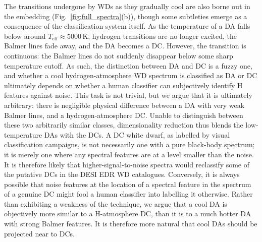 \documentclass[fleqn,usenatbib]{mnras}
\def\Teff{T_\mathrm{eff}}
\begin{document}
The transitions undergone by WDs as they gradually cool are also borne out in the embedding (Fig.~\ref{fig:full_spectra}(b)), though some subtleties emerge as a consequence of the classification system itself.
As the temperature of a DA falls below around $\Teff\approx 5000\,\text{K}$, hydrogen transitions are no longer excited, the Balmer lines fade away, and the DA becomes a DC.
However, the transition is continuous: the Balmer lines do not suddenly disappear below some sharp temperature cutoff.
As such, the distinction between DA and DC is a fuzzy one, and whether a cool hydrogen-atmosphere WD spectrum is classified as DA or DC ultimately depends on whether a human classifier can subjectively identify H features against noise.
This task is not trivial, but we argue that it is ultimately arbitrary: there is negligible physical difference between a DA with very weak Balmer lines, and a hydrogen-atmosphere DC.
Unable to distinguish between these two arbitrarily similar classes, dimensionality reduction thus blends the low-temperature DAs with the DCs.
A DC white dwarf, as labelled by visual classification campaigns, is not necessarily one with a pure black-body spectrum; it is merely one where any spectral features are at a level smaller than the noise.
It is therefore likely that higher-signal-to-noise spectra would reclassify some of the putative DCs in the DESI EDR WD catalogues.
Conversely, it is always possible that noise features at the location of a spectral feature in the spectrum of a genuine DC might fool a human classifier into labelling it otherwise.
Rather than exhibiting a weakness of the technique, we argue that a cool DA is objectively more similar to a H-atmosphere DC, than it is to a much hotter DA with strong Balmer features.
It is therefore more natural that cool DAs should be projected near to DCs.
\end{document}
